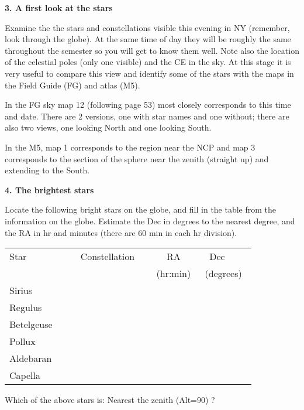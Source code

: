 \bigskip\noindent
{\bf 3. A first look at the stars}

\medskip
\noindent 
Examine the the stars and constellations visible this evening in NY
(remember, look through the globe). At
the same time of day they will be roughly the same throughout the
semester so you will get to know them well. Note also the location of
the celestial poles (only one visible) and the CE in the sky. At this
stage it is very useful to compare this view and identify some of the
stars with the maps in the Field Guide (FG) and atlas (M5).

In the FG sky map 12 (following page 53) most closely corresponds to
this time and date. There are 2 versions, one with star names and one
without; there are also two views, one looking North and one looking
South.

In the M5, map 1 corresponds to the region near the NCP and map 3
corresponds to the section of the sphere near the zenith (straight up)
and extending to the South.


\newpage

\bigskip\noindent
{\bf 4. The brightest stars}

\bigskip\noindent
Locate the following bright stars on the globe,
and fill in the table from the information on the globe. Estimate the
Dec in degrees to the nearest degree, and the RA in hr and minutes
(there are 60 min in each hr division).
\begin{center}
\begin{tabular}{lccc} \hline
Star  & \ \ \ \ Constellation \ \ &\hspace{1.5cm} RA \hspace{1.5cm} & \ \ Dec \ \ \ \ \\
          &     & (hr:min) & (degrees)   \\ \hline
Sirius   &  &   &        \\ \hline
Regulus   &  &   &       \\ \hline
Betelgeuse  &  &   &       \\ \hline
Pollux  &  &   &       \\ \hline
Aldebaran  &  &   &       \\  \hline
Capella &  &   &     \\  \hline 
\end{tabular}
\end{center}

\bigskip
Which of the above stars is:
\medskip
Nearest the zenith (Alt=90\deg) ? \ \makebox[4cm]{\hrulefill}

